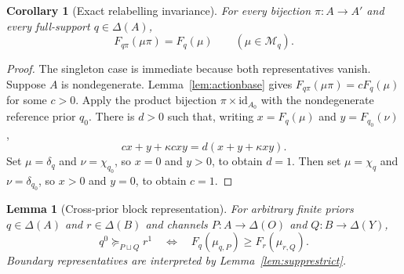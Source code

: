 \documentclass[11pt,a4paper]{article}
\newtheorem{lemma}[theorem]{Lemma}
\newtheorem{corollary}[theorem]{Corollary}
\theoremstyle{definition}
\newcommand{\1}{\mathbf 1}
\begin{document}
\begin{corollary}[Exact relabelling invariance]\label{cor:permutationinvariance}
For every bijection $\pi:A\to A'$ and every full-support $q\in\Delta(A)$,
\[
F_{q\pi}(\mu\pi)=F_q(\mu)
\qquad(\mu\in\mathcal M_q).
\]
\end{corollary}

\begin{proof}
The singleton case is immediate because both representatives vanish.  Suppose $A$ is nondegenerate.  Lemma~\ref{lem:actionbase}
gives $F_{q\pi}(\mu\pi)=cF_q(\mu)$ for some $c>0$.  Apply the product bijection
$\pi\times\mathrm{id}_{A_0}$ with the nondegenerate reference prior $q_0$.  There is $d>0$ such that, writing
$x=F_q(\mu)$ and $y=F_{q_0}(\nu)$,
\[
cx+y+\kappa cxy=d(x+y+\kappa xy).
\]
Set $\mu=\delta_q$ and $\nu=\chi_{q_0}$, so $x=0$ and $y>0$, to obtain $d=1$.  Then set
$\mu=\chi_q$ and $\nu=\delta_{q_0}$, so $x>0$ and $y=0$, to obtain $c=1$.
\end{proof}

\begin{lemma}[Cross-prior block representation]\label{lem:blockbridge}
For arbitrary finite priors $q\in\Delta(A)$ and $r\in\Delta(B)$ and channels
$P:A\to\Delta(O)$ and $Q:B\to\Delta(Y)$,
\begin{equation}
q^0\succeq_{P\sqcup Q}r^1
\quad\Longleftrightarrow\quad
F_q(\mu_{q,P})\ge F_r(\mu_{r,Q}).
\tag{BC}\label{eq:blockcomp}
\end{equation}
Boundary representatives are interpreted by Lemma~\ref{lem:supprestrict}.
\end{lemma}
\end{document}
